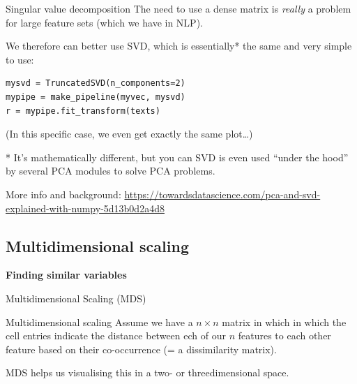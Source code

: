 \documentclass{beamer}
\begin{document}
\begin{frame}[fragile]{Singular value decomposition}
The need to use a dense matrix is \emph{really} a problem for large feature sets (which we have in NLP).
\pause

We therefore can better use SVD, which is essentially* the same and very simple to use:

\begin{lstlisting}
mysvd = TruncatedSVD(n_components=2)
mypipe = make_pipeline(myvec, mysvd)
r = mypipe.fit_transform(texts)
\end{lstlisting}

\footnotesize{(In this specific case, we even get exactly the same plot\ldots)}


\footnotesize{
* It's mathematically different, but you can SVD is even used ``under the hood'' by several PCA modules to solve PCA problems.

More info and background: \url{https://towardsdatascience.com/pca-and-svd-explained-with-numpy-5d13b0d2a4d8}}

\end{frame}


\subsection{Multidimensional scaling}

\begin{frame}[plain]
\textbf{Finding similar variables}

Multidimensional Scaling (MDS)
\end{frame}

\begin{frame}{Multidimensional scaling}
Assume we have a $n \times n$ matrix in which in which the cell entries indicate the distance between ech of our $n$ features to each other feature based on their co-occurrence (= a dissimilarity matrix).
\pause 

MDS helps us visualising this in a two- or threedimensional space.

\end{frame}
\end{document}
